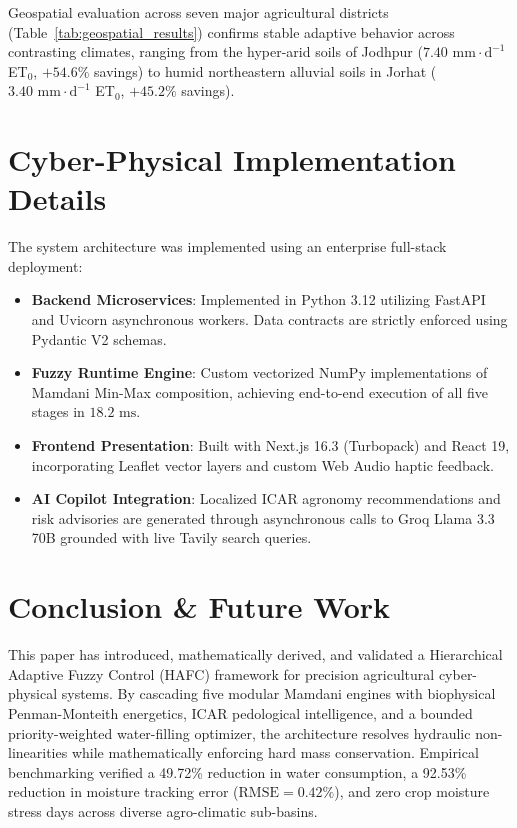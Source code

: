 \documentclass[conference]{IEEEtran}
\begin{document}
Geospatial evaluation across seven major agricultural districts (Table~\ref{tab:geospatial_results}) confirms stable adaptive behavior across contrasting climates, ranging from the hyper-arid soils of Jodhpur ($7.40\text{ mm}\cdot\text{d}^{-1}$ ET$_0$, $+54.6\%$ savings) to humid northeastern alluvial soils in Jorhat ($3.40\text{ mm}\cdot\text{d}^{-1}$ ET$_0$, $+45.2\%$ savings).

\section{Cyber-Physical Implementation Details}
The system architecture was implemented using an enterprise full-stack deployment:
\begin{itemize}
    \item \textbf{Backend Microservices}: Implemented in Python 3.12 utilizing FastAPI and Uvicorn asynchronous workers. Data contracts are strictly enforced using Pydantic V2 schemas.
    \item \textbf{Fuzzy Runtime Engine}: Custom vectorized NumPy implementations of Mamdani Min-Max composition, achieving end-to-end execution of all five stages in $18.2\text{ ms}$.
    \item \textbf{Frontend Presentation}: Built with Next.js 16.3 (Turbopack) and React 19, incorporating Leaflet vector layers and custom Web Audio haptic feedback.
    \item \textbf{AI Copilot Integration}: Localized ICAR agronomy recommendations and risk advisories are generated through asynchronous calls to Groq Llama 3.3 70B grounded with live Tavily search queries.
\end{itemize}

\section{Conclusion \& Future Work}
This paper has introduced, mathematically derived, and validated a Hierarchical Adaptive Fuzzy Control (HAFC) framework for precision agricultural cyber-physical systems. By cascading five modular Mamdani engines with biophysical Penman-Monteith energetics, ICAR pedological intelligence, and a bounded priority-weighted water-filling optimizer, the architecture resolves hydraulic non-linearities while mathematically enforcing hard mass conservation. Empirical benchmarking verified a 49.72\% reduction in water consumption, a 92.53\% reduction in moisture tracking error ($\text{RMSE} = 0.42\%$), and zero crop moisture stress days across diverse agro-climatic sub-basins.
\end{document}
